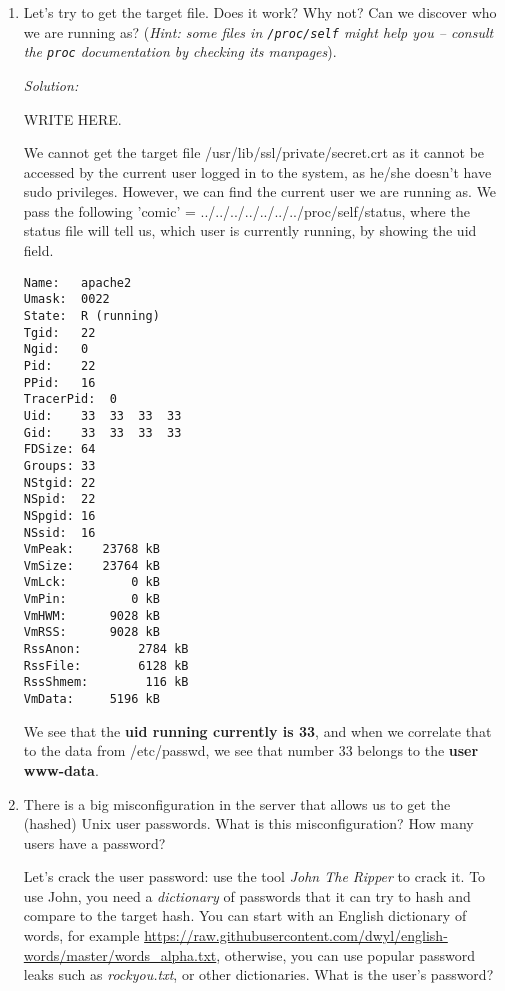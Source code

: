 \documentclass[a4paper,11pt]{article}
\newenvironment{solution}%
{\par{\noindent\small\textit{Solution:}}\vspace{-12pt}\begin{framed}}%
{\end{framed}\par}
\begin{document}
\begin{enumerate}
\begin{solution}
\end{solution}\fi

	\item Let's try to get the target file. Does it work? Why not? Can we discover who we are running as? (\textit{Hint: some files in \texttt{/proc/self} might help you -- consult the \texttt{proc} documentation by checking its manpages}).
	
	\ifsolution\begin{solution}
WRITE HERE. 

We cannot get the target file /usr/lib/ssl/private/secret.crt as it cannot be accessed by the current user logged in to the system, as he/she doesn't have sudo privileges. However, we can find the current user we are running as. We pass the following 'comic' = ../../../../../../../proc/self/status, where the status file will tell us, which user is currently running, by showing the uid field.

\begin{verbatim}
Name:	apache2
Umask:	0022
State:	R (running)
Tgid:	22
Ngid:	0
Pid:	22
PPid:	16
TracerPid:	0
Uid:	33	33	33	33
Gid:	33	33	33	33
FDSize:	64
Groups:	33 
NStgid:	22
NSpid:	22
NSpgid:	16
NSsid:	16
VmPeak:	   23768 kB
VmSize:	   23764 kB
VmLck:	       0 kB
VmPin:	       0 kB
VmHWM:	    9028 kB
VmRSS:	    9028 kB
RssAnon:	    2784 kB
RssFile:	    6128 kB
RssShmem:	     116 kB
VmData:	    5196 kB
\end{verbatim}
We see that the \textbf{uid running currently is 33}, and when we correlate that to the data from /etc/passwd, we see that number 33 belongs to the \textbf{user www-data}.
\end{solution}\fi

\item There is a big misconfiguration in the server that allows us to get the (hashed) Unix user passwords. What is this misconfiguration? How many users have a password?

Let's crack the user password: use the tool \textit{John The Ripper} to crack it. To use John, you need a \textit{dictionary} of passwords that it can try to hash and compare to the target hash.
You can start with an English dictionary of words, for example \url{https://raw.githubusercontent.com/dwyl/english-words/master/words_alpha.txt}, otherwise, you can use popular password leaks such as \textit{rockyou.txt}, or other dictionaries. What is the user's password?
	

\end{enumerate}
\end{document}
